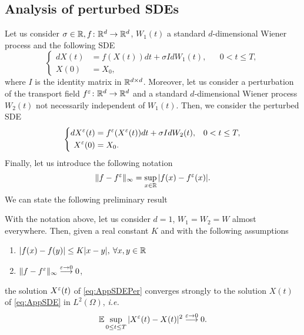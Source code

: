\subsection{Analysis of perturbed SDEs}
Let us consider $\sigma \in \mathbb{R}, f\colon \mathbb{R}^d \rightarrow \mathbb{R}^d$, $W_1(t)$ a standard $d$-dimensional Wiener process and the following SDE
\begin{equation}\label{eq:AppSDE}
\left \{
\begin{aligned}
	dX(t) &= f(X(t))dt + \sigma IdW_1(t), && 0 < t \leq T, \\
	X(0) &= X_0,
\end{aligned} \right .
\end{equation}
where $I$ is the identity matrix in $\mathbb{R}^{d\times d}$. Moreover, let us consider a perturbation of the transport field $f^\varepsilon\colon \mathbb{R}^d \rightarrow \mathbb{R}^d$ and a standard $d$-dimensional Wiener process $W_2(t)$ not necessarily independent of $W_1(t)$. Then, we consider the perturbed SDE 
\begin{equation}\label{eq:AppSDEPer}
\left \{
\begin{aligned}
	dX^\varepsilon(t) &= f^\varepsilon(X^\varepsilon(t))dt + \sigma I dW_2(t), && 0 < t \leq T, \\
	X^\varepsilon(0) &= X_0.
\end{aligned} \right .
\end{equation}
Finally, let us introduce the following notation
\begin{equation*}
	\|f - f^\varepsilon\|_{\infty} = \sup_{x\in \mathbb{R}} |f(x) - f^\varepsilon(x)|.
\end{equation*}
We can state the following preliminary result
\begin{lemma}\label{lem:Lemma1} With the notation above, let us consider $d = 1$, $W_1 = W_2 = W$ almost everywhere. Then, given a real constant $K$ and with the following assumptions
\begin{enumerate}
	\item $|f(x) - f(y)| \leq K|x - y|, \: \forall x,y \in \mathbb{R}$
 	\item $\|f - f^\varepsilon\|_{\infty} \stackrel{\varepsilon \rightarrow 0}\longrightarrow 0$,
\end{enumerate}
the solution $X^\varepsilon(t)$ of \eqref{eq:AppSDEPer} converges strongly to the solution $X(t)$ of \eqref{eq:AppSDE} in $L^2(\Omega)$, \textit{i.e.}
\begin{equation*}
	\mathbb{E} \sup_{0 \leq t \leq T} |X^\varepsilon(t) - X(t)|^2 \stackrel{\varepsilon \rightarrow 0}\longrightarrow 0.
\end{equation*}
\end{lemma}

